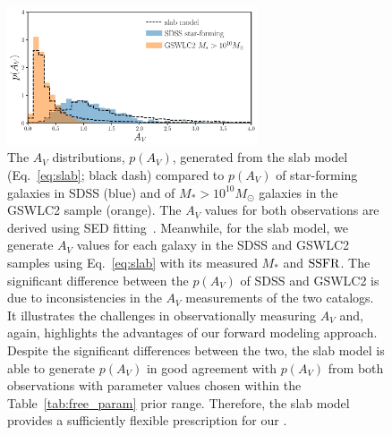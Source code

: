 \begin{figure}
    \begin{center}
        \includegraphics[width=0.66\textwidth]{figs/slab_model.pdf} 
        \caption{\label{fig:av_dist}
        The $A_V$ distributions, $p(A_V)$, generated from the slab model (Eq.~\ref{eq:slab};
        black dash) compared to $p(A_V)$ of star-forming galaxies in SDSS
        (blue) and of $M_* > 10^{10}M_\odot$ galaxies in the \cite{salim2018} GSWLC2 sample (orange). 
        The $A_V$ values for both observations are derived using SED
        fitting~\citep{brinchmann2004, salim2018}. 
        Meanwhile, for the slab model, we generate $A_V$ values for each galaxy
        in the SDSS and GSWLC2 samples using Eq.~\ref{eq:slab} with its
        measured $M_*$ and ${\rm SSFR}$. 
        The significant difference between the $p(A_V)$ of SDSS and GSWLC2 is
        due to inconsistencies in the $A_V$ measurements of the two catalogs. 
        It illustrates the challenges in observationally measuring $A_V$ and,
        again, highlights the advantages of our forward modeling approach. 
        Despite the significant differences between the two, the slab model is
        able to generate $p(A_V)$ in good agreement with $p(A_V)$ from both
        observations with parameter values chosen within the
        Table~\ref{tab:free_param} prior range. 
        Therefore, the slab model provides a sufficiently flexible prescription
        for our \eda.
        }
    \end{center}
\end{figure}


